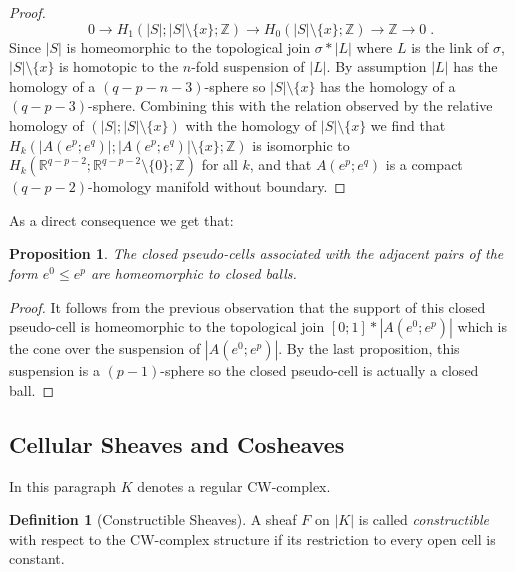 \documentclass[10pt]{amsart}
\newtheorem{prop}[theo]{Proposition}
\theoremstyle{definition}
\newtheorem{defi}[theo]{Definition}
\numberwithin{equation}{section}
\numberwithin{figure}{section}
\newcommand{\R}{\mathbb{R}}
\newcommand{\Z}{\mathbb{Z}}
\begin{document}
\begin{proof}
\begin{equation*}
0 \rightarrow H_1(|S|;|S|\setminus\{x\};\Z) \rightarrow H_0(|S|\setminus\{x\};\Z) \rightarrow \Z \rightarrow 0\;.
\end{equation*}
Since $|S|$ is homeomorphic to the topological join $\sigma * |L|$ where $L$ is the link of $\sigma$, $|S|\setminus\{x\}$ is homotopic to the $n$-fold suspension of $|L|$. By assumption $|L|$ has the homology of a $(q-p-n-3)$-sphere so $|S|\setminus\{x\}$ has the homology of a $(q-p-3)$-sphere. Combining this with the relation observed by the relative homology of $(|S|;|S|\setminus\{x\})$ with the homology of $|S|\setminus\{x\}$ we find that $H_k(|A(e^p;e^q)|;|A(e^p;e^q)|\setminus\{x\};\Z)$ is isomorphic to $H_k(\R^{q-p-2};\R^{q-p-2}\setminus\{0\};\Z)$ for all $k$, and that $A(e^p;e^q)$ is a compact $(q-p-2)$-homology manifold without boundary.
\end{proof}

As a direct consequence we get that:

\begin{prop}\label{prop:initial_cells}
The closed pseudo-cells associated with the adjacent pairs of the form $e^0\leq e^p$ are homeomorphic to closed balls.
\end{prop}

\begin{proof}
It follows from the previous observation that the support of this closed pseudo-cell is homeomorphic to the topological join $[0;1]*|A(e^0;e^p)|$ which is the cone over the suspension of $|A(e^0;e^p)|$. By the last proposition, this suspension is a $(p-1)$-sphere so the closed pseudo-cell is actually a closed ball.
\end{proof}
\setcounter{theo}{26}
\setcounter{figure}{8}
\subsection{Cellular Sheaves and Cosheaves}

In this paragraph $K$ denotes a regular CW-complex.

\begin{defi}[Constructible Sheaves]
A sheaf $F$ on $|K|$ is called \emph{constructible} with respect to the CW-complex structure if its restriction to every open cell is constant.
\end{defi}
\end{document}
